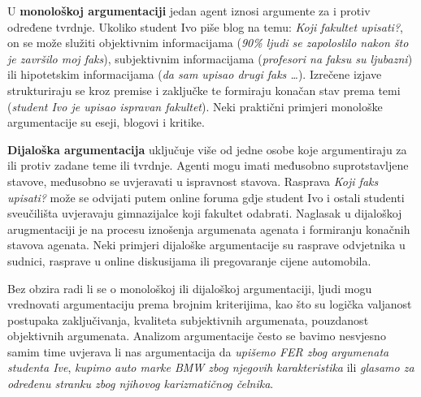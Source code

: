 U \textbf{monološkoj argumentaciji} jedan agent iznosi argumente za i protiv određene tvrdnje. 
Ukoliko student Ivo piše blog na temu: 
\emph{Koji fakultet upisati?}, on 
se može služiti objektivnim informacijama (\emph{90\% ljudi se zapoloslilo nakon što je
završilo moj faks}), subjektivnim informacijama (\emph{profesori na faksu su
ljubazni}) ili hipotetskim informacijama (\emph{da sam upisao drugi faks \dots}).
Izrečene izjave strukturiraju se kroz premise i zaključke te formiraju konačan stav 
prema temi (\emph{student Ivo je upisao ispravan fakultet}).
Neki praktični primjeri monološke argumentacije su eseji, blogovi i kritike. 

\textbf{Dijaloška argumentacija} uključuje više od jedne osobe koje 
argumentiraju za ili protiv zadane teme ili tvrdnje. Agenti mogu imati
međusobno suprotstavljene stavove, međusobno se uvjeravati 
u ispravnost stavova. Rasprava \emph{Koji faks upisati?} može se odvijati 
putem online foruma gdje student Ivo i ostali studenti 
sveučilišta uvjeravaju gimnazijalce koji fakultet odabrati.  
Naglasak u dijaloškoj arugmentaciji je na
procesu iznošenja argumenata agenata i formiranju konačnih 
stavova agenata. Neki primjeri dijaloške argumentacije su rasprave odvjetnika
u sudnici, rasprave u online diskusijama ili pregovaranje cijene 
automobila.

Bez obzira radi li se o monološkoj ili dijaloškoj argumentaciji, 
ljudi mogu vrednovati argumentaciju prema 
brojnim kriterijima, kao što su 
logička valjanost postupaka zaključivanja, 
kvaliteta subjektivnih argumenata, 
pouzdanost objektivnih argumenata. 
Analizom argumentacije često se bavimo nesvjesno
samim time uvjerava li nas argumentacija da
\emph{upišemo FER zbog argumenata studenta Ive},
\emph{kupimo auto marke BMW zbog njegovih karakteristika}
ili \emph{glasamo za određenu stranku zbog njihovog
karizmatičnog čelnika}. 




